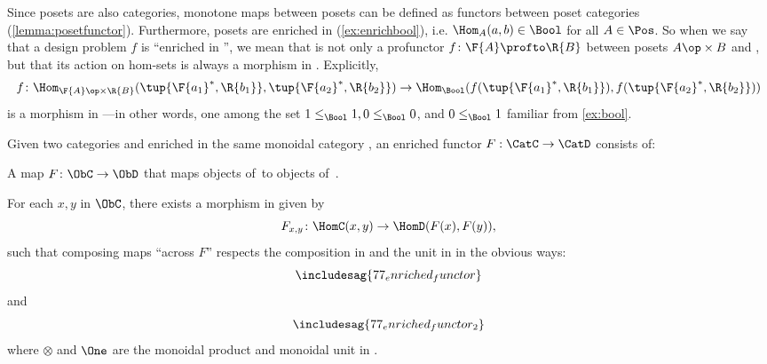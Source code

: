 Since posets are also categories, monotone maps between posets can be defined as functors between poset categories (\cref{lemma:posetfunctor}). Furthermore, posets are enriched in \Bool (\cref{ex:enrichbool}), i.e. $\Hom_A(a,b) \in \Bool$ for all $A \in \Pos$. So when we say that a design problem $f$ is ``enriched in \Bool'', we mean that is not only a profunctor $f \colon \F{A} \profto \R{B}$ between posets $A\op \times B$ and \Bool, but that its action on hom-sets is always a morphism in \Bool. Explicitly,
\begin{equation}
f \colon \Hom_{\F{A}\op \times \R{B}}(\tup{\F{a_1}^*,\R{b_1}}, \tup{\F{a_2}^*,\R{b_2}}) \to \Hom_\Bool(f(\tup{\F{a_1}^*,\R{b_1}}), f(\tup{\F{a_2}^*,\R{b_2}}))
\end{equation}
is a morphism in \Bool---in other words, one among the set $1 \leq_\Bool 1, 0 \leq_\Bool 0$, and $0 \leq_\Bool 1$ familiar from \cref{ex:bool}.

\begin{ctdefinition}
\label{defn:enrichedfunctor}
Given two categories \CatC and \CatD enriched in the same monoidal category \CatV, an enriched functor $F: \CatC \to \CatD$ consists of:
\begin{compactenum}
\item A map $F\colon \ObC \to \ObD$ that maps objects of~\CatC to objects of~\CatD.
\item For each $x, y$ in $\ObC$, there exists a morphism in \CatV given by
\begin{equation}
F_{x,y} \colon \HomC(x,y) \to \HomD(F(x), F(y)),
\end{equation}
such that composing maps ``across $F$'' respects the composition in \CatC and the unit in \CatV in the obvious ways:
\begin{equation}
\includesag{77_enriched_functor}
\end{equation}
and
\begin{equation}
\includesag{77_enriched_functor_2}
\end{equation}
where $\otimes$ and $\One$ are the monoidal product and monoidal unit in \CatV.
\end{compactenum}
\end{ctdefinition}

